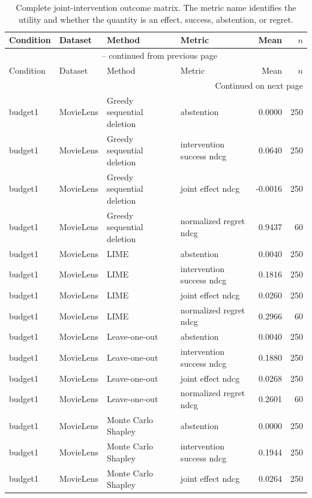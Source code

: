 \begin{longtable}{@{}p{.16\linewidth}p{.11\linewidth}p{.15\linewidth}p{.22\linewidth}rr@{}}
\caption{Complete joint-intervention outcome matrix. The metric name identifies the utility and whether the quantity is an effect, success, abstention, or regret.}\label{tab:S2}\\
\toprule
Condition & Dataset & Method & Metric & Mean & $n$ \\
\midrule
\endfirsthead
\multicolumn{6}{c}{\tablename\ \thetable{} -- continued from previous page}\\
\toprule
Condition & Dataset & Method & Metric & Mean & $n$ \\
\midrule
\endhead
\midrule
\multicolumn{6}{r}{Continued on next page}\\
\endfoot
\bottomrule
\endlastfoot
budget1 & MovieLens & Greedy sequential deletion & abstention & 0.0000 & 250 \\
budget1 & MovieLens & Greedy sequential deletion & intervention success ndcg & 0.0640 & 250 \\
budget1 & MovieLens & Greedy sequential deletion & joint effect ndcg & -0.0016 & 250 \\
budget1 & MovieLens & Greedy sequential deletion & normalized regret ndcg & 0.9437 & 60 \\
budget1 & MovieLens & LIME & abstention & 0.0040 & 250 \\
budget1 & MovieLens & LIME & intervention success ndcg & 0.1816 & 250 \\
budget1 & MovieLens & LIME & joint effect ndcg & 0.0260 & 250 \\
budget1 & MovieLens & LIME & normalized regret ndcg & 0.2966 & 60 \\
budget1 & MovieLens & Leave-one-out & abstention & 0.0040 & 250 \\
budget1 & MovieLens & Leave-one-out & intervention success ndcg & 0.1880 & 250 \\
budget1 & MovieLens & Leave-one-out & joint effect ndcg & 0.0268 & 250 \\
budget1 & MovieLens & Leave-one-out & normalized regret ndcg & 0.2601 & 60 \\
budget1 & MovieLens & Monte Carlo Shapley & abstention & 0.0000 & 250 \\
budget1 & MovieLens & Monte Carlo Shapley & intervention success ndcg & 0.1944 & 250 \\
budget1 & MovieLens & Monte Carlo Shapley & joint effect ndcg & 0.0264 & 250 \\

\end{longtable}
